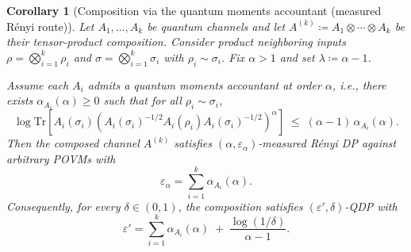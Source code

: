 \documentclass[11pt]{article}
\def\Tr{\mathrm{Tr}}
\theoremstyle{plain}
\newtheorem{corollary}[theo]{Corollary}
\theoremstyle{remark}
\begin{document}
\begin{corollary}[Composition via the quantum moments accountant (measured R\'enyi route)]
\label{cor:qma-composition}
Let $A_1,\ldots,A_k$ be quantum channels and let
$
A^{(k)} \coloneqq A_1\otimes\cdots\otimes A_k
$
be their tensor-product composition. Consider product neighboring inputs
$\rho=\bigotimes_{i=1}^k \rho_i$ and $\sigma=\bigotimes_{i=1}^k \sigma_i$ with $\rho_i\sim\sigma_i$.
Fix $\alpha>1$ and set $\lambda\coloneqq\alpha-1$.

Assume each $A_i$ admits a quantum moments accountant at order $\alpha$, i.e.,
there exists $\alpha_{A_i}(\alpha)\ge 0$ such that for all $\rho_i\sim\sigma_i$,
\begin{equation}
\label{eq:alphaAi-def}
\log \Tr\!\left[
A_i(\sigma_i)\left(A_i(\sigma_i)^{-1/2}A_i(\rho_i)A_i(\sigma_i)^{-1/2}\right)^{\alpha}
\right]
\;\le\;
(\alpha-1)\,\alpha_{A_i}(\alpha).
\end{equation}
Then the composed channel $A^{(k)}$ satisfies $(\alpha,\varepsilon_\alpha)$-\emph{measured R\'enyi DP}
against arbitrary POVMs with
\begin{equation}
\label{eq:measured-rdp-composed}
\varepsilon_\alpha
=
\sum_{i=1}^k \alpha_{A_i}(\alpha).
\end{equation}
Consequently, for every $\delta\in(0,1)$, the composition satisfies $(\varepsilon',\delta)$-QDP with
\begin{equation}
\label{eq:qdp-from-composed}
\varepsilon'
=
\sum_{i=1}^k \alpha_{A_i}(\alpha)
\;+\;
\frac{\log(1/\delta)}{\alpha-1}.
\end{equation}
\end{corollary}
\end{document}
